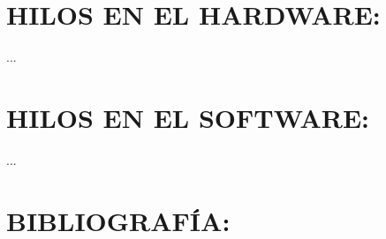 \documentclass[12pt,letterpaper]{article}
\begin{document}
\section{HILOS EN EL HARDWARE:}

...


\section{HILOS EN EL SOFTWARE:}

...

\section{BIBLIOGRAFÍA:}















\end{document}
